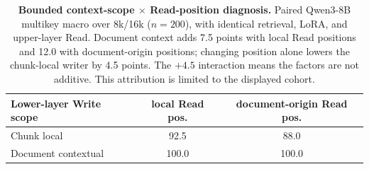 \begin{table}[!htbp]
\centering
\small
\setlength{\tabcolsep}{3pt}
\begin{tabular}{@{}lcc@{}}
\toprule
\textbf{Lower-layer Write scope} & \textbf{local Read pos.} &
\textbf{document-origin Read pos.} \\
\midrule
Chunk local & 92.5 & 88.0 \\
Document contextual & 100.0 & 100.0 \\
\bottomrule
\end{tabular}
\caption{\textbf{Bounded context-scope $\times$ Read-position diagnosis.}
Paired Qwen3-8B multikey macro over 8k/16k ($n{=}200$), with identical
retrieval, LoRA, and upper-layer Read. Document context adds 7.5 points with
local Read positions and 12.0 with document-origin positions; changing position
alone lowers the chunk-local writer by 4.5 points. The $+4.5$ interaction means
the factors are not additive. This attribution is limited to the displayed
cohort.}
\label{tab:context-position}
\end{table}

